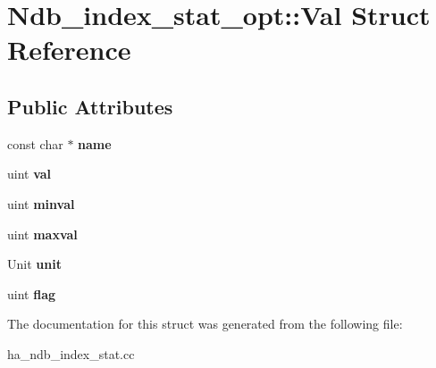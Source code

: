 \hypertarget{structNdb__index__stat__opt_1_1Val}{}\section{Ndb\+\_\+index\+\_\+stat\+\_\+opt\+:\+:Val Struct Reference}
\label{structNdb__index__stat__opt_1_1Val}
\subsection*{Public Attributes}
\begin{DoxyCompactItemize}
\item 
\mbox{\label{structNdb__index__stat__opt_1_1Val_ae8078673e1cf52abcf424db88aea978c}} 
const char $\ast$ {\bfseries name}
\item 
\mbox{\label{structNdb__index__stat__opt_1_1Val_a9f97dc1e3f3b67ed841da16361026b62}} 
uint {\bfseries val}
\item 
\mbox{\label{structNdb__index__stat__opt_1_1Val_a7680723b91c8f8f8b2c994b598afd17c}} 
uint {\bfseries minval}
\item 
\mbox{\label{structNdb__index__stat__opt_1_1Val_adeb5518977ff85cf0002f0396c4dcd53}} 
uint {\bfseries maxval}
\item 
\mbox{\label{structNdb__index__stat__opt_1_1Val_a50fddf78dbd802029672d732661f4cd6}} 
Unit {\bfseries unit}
\item 
\mbox{\label{structNdb__index__stat__opt_1_1Val_a98af8fd852ace489b75f37a8a21b9ddf}} 
uint {\bfseries flag}
\end{DoxyCompactItemize}


The documentation for this struct was generated from the following file\+:\begin{DoxyCompactItemize}
\item 
ha\+\_\+ndb\+\_\+index\+\_\+stat.\+cc\end{DoxyCompactItemize}
